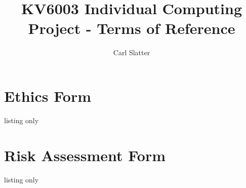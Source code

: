 \documentclass[12pt]{article}
\title{ KV6003 Individual Computing Project - Terms of Reference }
\author{Carl Slatter}
\begin{document}
\maketitle




\appendix

\section{Ethics Form}
\begin{tcblisting}{listing only}

\end{tcblisting}


\section{Risk Assessment Form}
\begin{tcblisting}{listing only}

\end{tcblisting}
\end{document}
